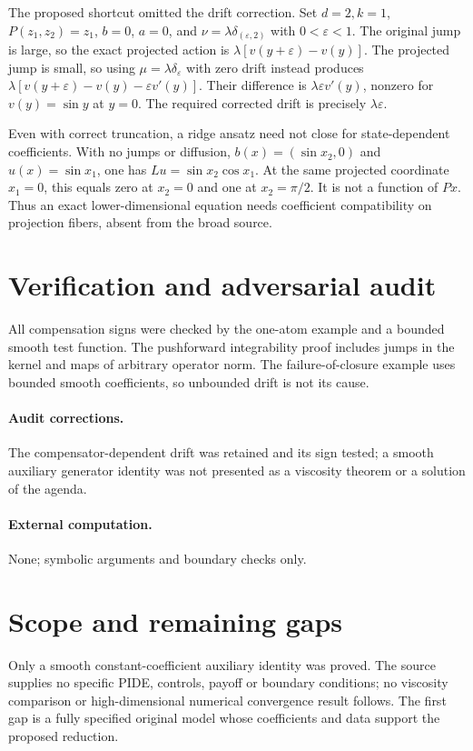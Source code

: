 \documentclass[11pt]{article}
\begin{document}
The proposed shortcut omitted the drift correction. Set $d=2,k=1$,
$P(z_1,z_2)=z_1$, $b=0$, $a=0$, and
$\nu=\lambda\delta_{(\varepsilon,2)}$ with $0<\varepsilon<1$.
The original jump is large, so the exact projected action is
$\lambda[v(y+\varepsilon)-v(y)]$. The projected jump is small, so using
$\mu=\lambda\delta_\varepsilon$ with zero drift instead produces
$\lambda[v(y+\varepsilon)-v(y)-\varepsilon v'(y)]$.
Their difference is $\lambda\varepsilon v'(y)$, nonzero for $v(y)=\sin y$
at $y=0$. The required corrected drift is precisely $\lambda\varepsilon$.

Even with correct truncation, a ridge ansatz need not close for state-dependent
coefficients. With no jumps or diffusion, $b(x)=(\sin x_2,0)$ and
$u(x)=\sin x_1$, one has $Lu=\sin x_2\cos x_1$. At the same projected
coordinate $x_1=0$, this equals zero at $x_2=0$ and one at $x_2=\pi/2$.
It is not a function of $Px$. Thus an exact lower-dimensional equation needs
coefficient compatibility on projection fibers, absent from the broad source.
\section{Verification and adversarial audit}
All compensation signs were checked by the one-atom example and a bounded
smooth test function. The pushforward integrability proof includes jumps in
the kernel and maps of arbitrary operator norm. The failure-of-closure example
uses bounded smooth coefficients, so unbounded drift is not its cause.
\paragraph{Audit corrections.} The compensator-dependent drift was retained and its sign tested; a smooth auxiliary generator identity was not presented as a viscosity theorem or a solution of the agenda.
\paragraph{External computation.} None; symbolic arguments and boundary checks only.
\section{Scope and remaining gaps}
Only a smooth constant-coefficient auxiliary identity was proved. The
source supplies no specific PIDE, controls, payoff or boundary conditions; no
viscosity comparison or high-dimensional numerical convergence result follows.
The first gap is a fully specified original model whose coefficients and data
support the proposed reduction.
\end{document}
